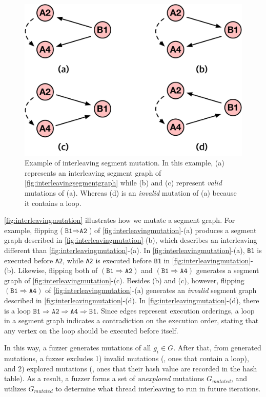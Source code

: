 \begin{figure}[t]
  \centering
  \includegraphics[width=0.7\linewidth]{fig/interleavingmutation.pdf}
  \caption{Example of interleaving segment mutation. In this example,
    (a) represents an interleaving segment graph of
    \autoref{fig:interleavingsegmentgraph} while (b) and (c) represent
    \textit{valid} mutations of (a). Whereas (d) is an
    \textit{invalid} mutation of (a) because it contains a loop.}
  \label{fig:interleavingmutation}
\end{figure}
%
\autoref{fig:interleavingmutation} illustrates how we mutate a segment
graph.
%
For example, flipping ($\texttt{B1} \Rightarrow \texttt{A2}$) of
\autoref{fig:interleavingmutation}-(a) produces a segment graph
described in \autoref{fig:interleavingmutation}-(b), which describes
an interleaving different than \autoref{fig:interleavingmutation}-(a).
%
In \autoref{fig:interleavingmutation}-(a), \texttt{B1} is executed
before \texttt{A2}, while \texttt{A2} is executed before \texttt{B1}
in \autoref{fig:interleavingmutation}-(b).
%
Likewise, flipping both of $(\texttt{B1} \Rightarrow \texttt{A2})$ and
$(\texttt{B1} \Rightarrow \texttt{A4})$ generates a segment graph of
\autoref{fig:interleavingmutation}-(c).
%
Besides (b) and (c), however, flipping
$(\texttt{B1} \Rightarrow \texttt{A4})$ of
\autoref{fig:interleavingmutation}-(a) generates an \textit{invalid}
segment graph described in \autoref{fig:interleavingmutation}-(d).
%
In \autoref{fig:interleavingmutation}-(d), there is a loop
$\texttt{B1} \Rightarrow \texttt{A2} \Rightarrow \texttt{A4}
\Rightarrow \texttt{B1}$.
%
Since edges represent execution orderings, a loop in a segment graph
indicates a contradiction on the execution order, stating that any
vertex on the loop should be executed before itself.
%


In this way, a fuzzer generates mutations of all $g_i \in G$. After
that, from generated mutations, a fuzzer excludes 1) invalid mutations
(\ie, ones that contain a loop), and 2) explored mutations (\ie, ones
that their hash value are recorded in the hash table).
%
As a result, a fuzzer forms a set of \textit{unexplored} mutations
$G_{mutated}$, and utilizes $G_{mutated}$ to determine what thread
interleaving to run in future iterations.





